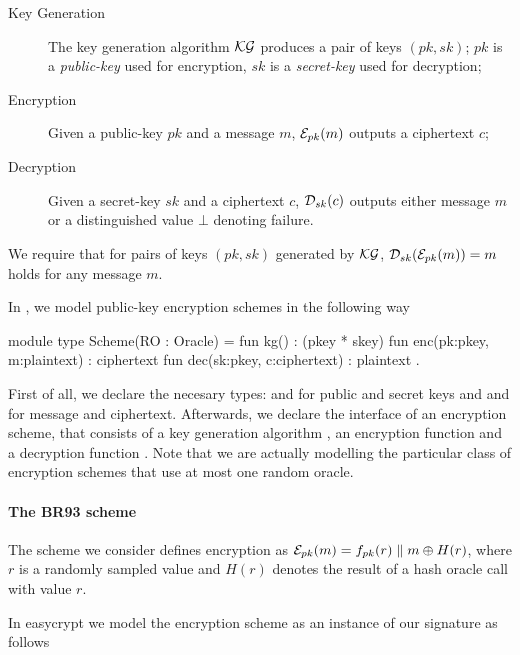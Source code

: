 \begin{description}
\item[Key Generation] 
  The key generation algorithm $\mathcal{KG}$ produces a pair of keys $(pk,sk)$;
  $pk$ is a \emph{public-key} used for encryption, $sk$ is
  a \emph{secret-key} used for decryption;

\item[Encryption] 
  Given a public-key $pk$ and a message $m$, $\mathcal{E}_{pk}(m)$ outputs a
  ciphertext $c$;

\item[Decryption] 
  Given a secret-key $sk$ and a ciphertext $c$, $\mathcal{D}_{sk}(c)$ outputs
  either message $m$ or a distinguished value $\bot$ denoting failure.
\end{description}
%
We require that for pairs of keys $(pk,sk)$ generated by $\mathcal{KG}$,
$\mathcal{D}_{sk}(\mathcal{E}_{pk}(m))= m$ holds for any message $m$. 

In \EC, we model public-key encryption schemes in the following way
\begin{easycrypt}[label={lst:enc_scheme}]{}
 module type Scheme(RO : Oracle) = {
  fun kg() : (pkey * skey)
  fun enc(pk:pkey, m:plaintext) : ciphertext
  fun dec(sk:pkey, c:ciphertext) : plaintext
 }.
\end{easycrypt}
First of all, we declare the necesary types:  and 
for public and secret keys and  and  for
message and ciphertext. Afterwards, we declare the interface of an
encryption scheme, that consists of a key generation algorithm
, an encryption function  and a decryption function
. Note that we are actually modelling the particular class of
encryption schemes that use at most one random oracle.

\paragraph{The BR93 scheme}
The scheme we consider defines encryption as 
$\mathcal{E}_{pk}(m) = f_{pk}(r) \parallel m \oplus H(r)$, where $r$ is a
randomly sampled value and $H(r)$ denotes the result of a hash oracle
call with value $r$.

 In easycrypt we model the encryption scheme as an instance of our
  signature as follows


